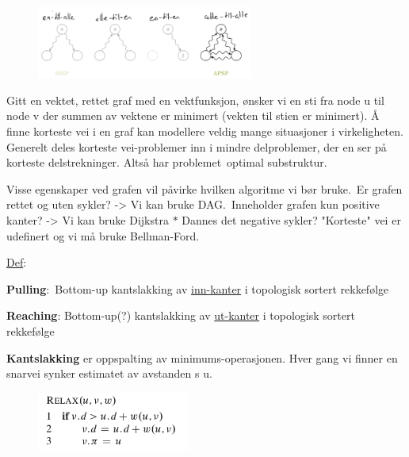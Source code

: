 \documentclass[12pt]{report}
\begin{document}

\begin{figure}[H]
\advance\leftskip 4.35in		\includegraphics[width=2.8in,height=0.94in]{./media/image123.png}
\end{figure}



\setlength{\parskip}{0.0pt}
Gitt en vektet, rettet graf med en vektfunksjon, ønsker vi en sti fra node u til node v der summen av vektene er minimert (vekten til stien er minimert). Å finne korteste vei i en graf kan modellere veldig mange situasjoner i virkeligheten. Generelt deles korteste vei-problemer inn i mindre delproblemer, der en ser på korteste delstrekninger. Altså har problemet optimal substruktur.\par


\vspace{\baselineskip}
Visse egenskaper ved grafen vil påvirke hvilken algoritme vi bør bruke. Er grafen rettet og uten sykler? -> Vi kan bruke DAG. Inneholder grafen kun positive kanter? -> Vi kan bruke Dijkstra $\ast$  Dannes det negative sykler? "Korteste" vei er udefinert og vi må bruke Bellman-Ford.\par

\uline{Def}:\par

\textbf{Pulling}:\  Bottom-up kantslakking av \uline{inn-kanter} i topologisk sortert rekkefølge\par

\textbf{Reaching}: Bottom-up(?) kantslakking av \uline{ut-kanter} i topologisk sortert rekkefølge\par

\textbf{Kantslakking} er oppspalting av minimums-operasjonen.  Hver gang vi finner en snarvei synker estimatet av avstanden s  u.\par




\begin{figure}[H]
	\begin{Center}
		\includegraphics[width=1.97in,height=0.77in]{./media/image124.png}
	\end{Center}
\end{figure}
\end{document}
